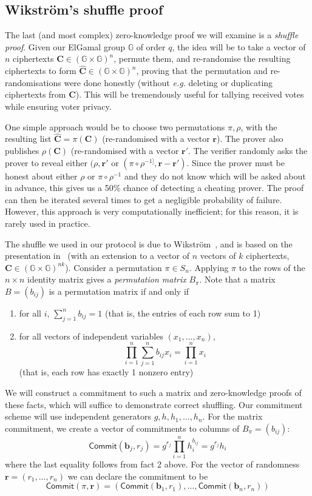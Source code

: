 \documentclass[12pt,a4paper]{article}
\newcommand{\commit}{\mathsf{Commit}}
\theoremstyle{definition}
\newcommand{\eg}{\textit{e.g. }}
\begin{document}
\subsection{Wikström's shuffle proof}
The last (and most complex) zero-knowledge proof we will examine is a \textit{shuffle proof}. Given our ElGamal group $\mathbb{G}$ of order $q$, the idea will be to take a vector of $n$ ciphertexts $\mathbf{C} \in (\mathbb{G}\times\mathbb{G})^{n}$, permute them, and re-randomise the resulting ciphertexts to form $\mathbf{\hat{C}}\in(\mathbb{G}\times\mathbb{G})^{n}$, proving that the permutation and re-randomisations were done honestly (without \eg deleting or duplicating ciphertexts from $\mathbf{C}$). This will be tremendously useful for tallying received votes while ensuring voter privacy.

One simple approach would be to choose two permutations $\pi,\rho$, with the resulting list $\mathbf{\hat{C}}=\pi(\mathbf{C})$ (re-randomised with a vector $\mathbf{r}$). The prover also publishes $\rho(\mathbf{C})$ (re-randomised with a vector $\mathbf{r'}$. The verifier randomly asks the prover to reveal either $(\rho, \mathbf{r'}$ or $(\pi\circ\rho^{-1]}, \mathbf{r}-\mathbf{r'})$. Since the prover must be honest about either $\rho$ or $\pi\circ\rho^{-1}$ and they do not know which will be asked about in advance, this gives us a 50\% chance of detecting a cheating prover. The proof can then be iterated several times to get a negligible probability of failure. However, this approach is very computationally inefficient; for this reason, it is rarely used in practice.

The shuffle we used in our protocol is due to Wikström~\cite{wikstrom2011implement}, and is based on the presentation in~\cite{haenni2017pseudo} (with an extension to a vector of $n$ vectors of $k$ ciphertexts, $\mathbf{C}\in(\mathbb{G}\times\mathbb{G})^{nk}$). Consider a permutation $\pi\in S_n$. Applying $\pi$ to the rows of the $n\times n$ identity matrix gives a \textit{permutation matrix} $B_\pi$. Note that a matrix $B=(b_{ij})$ is a permutation matrix if and only if
\begin{enumerate}
    \item for all $i$, $\sum_{j=1}^n b_{ij} = 1$ (that is, the entries of each row sum to 1)
    \item for all vectors of independent variables $(x_1,\ldots,x_n)$,
    $$\prod_{i=1}^n\sum_{j=1}^nb_{ij} x_i=\prod_{i=1}^n x_i$$
    (that is, each row has exactly 1 nonzero entry)
\end{enumerate}
We will construct a commitment to such a matrix and zero-knowledge proofs of these facts, which will suffice to demonstrate correct shuffling. Our commitment scheme will use independent generators $g, h, h_1, \ldots, h_n$. For the matrix commitment, we create a vector of commitments to columns of $B_\pi=(b_{ij})$:
$$\commit(\mathbf{b}_j, r_j) = g^{r_j}\prod_{i=1}^n h_i^{b_{ij}} = g^{r_j}h_i$$
where the last equality follows from fact 2 above. For the vector of randomness $\mathbf{r}=(r_1,\ldots, r_n)$ we can declare the commitment to be
$$\commit(\pi, \mathbf{r}) = (\commit(\mathbf{b}_1, r_1),\ldots,\commit(\mathbf{b}_n, r_n))$$
\end{document}
